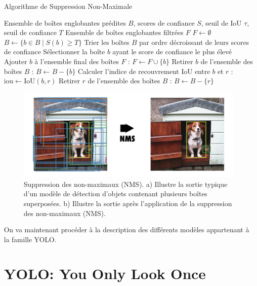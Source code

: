 \documentclass{article}
\begin{document}
\begin{algorithm}[htbp]
    \caption{Algorithme de Suppression Non-Maximale}
    \label{alg:NMS}
    \begin{algorithmic}[1]
    \Require Ensemble de boîtes englobantes prédites $B$, scores de confiance $S$, seuil de IoU $\tau$, seuil de confiance $T$
    \Ensure Ensemble de boîtes englobantes filtrées $F$
    \State $F \leftarrow \emptyset$
    \State $B \leftarrow \{b \in B \mid S(b) \geq T\}$
    \State Trier les boîtes $B$ par ordre décroissant de leurs scores de confiance
        \State Sélectionner la boîte $b$ ayant le score de confiance le plus élevé
        \State Ajouter $b$ à l'ensemble final des boîtes $F$ : $F \leftarrow F \cup \{b\}$
        \State Retirer $b$ de l'ensemble des boîtes $B$ : $B \leftarrow B - \{b\}$
            \State Calculer l'indice de recouvrement IoU entre $b$ et $r$ : $\text{iou} \leftarrow \text{IoU}(b, r)$
                \State Retirer $r$ de l'ensemble des boîtes $B$ : $B \leftarrow B - \{r\}$
            \EndIf
        \EndFor
    \EndWhile
    \end{algorithmic}
\end{algorithm}

\begin{figure}[htbp]
    \centering
    \includegraphics[scale=0.22]{Figures/NMS.png}
    \caption{Suppression des non-maximaux (NMS). a) Illustre la sortie typique d'un modèle de détection d'objets contenant plusieurs boîtes superposées. b) Illustre la sortie après l'application de la suppression des non-maximaux (NMS).}
    \label{fig:NMS}
\end{figure}
\vspace{0.6cm}

On va maintenant procéder à la description des différents modèles appartenant à la famille YOLO.

\section{YOLO: You Only Look Once}
\end{document}
